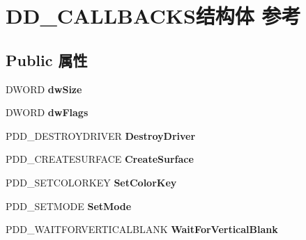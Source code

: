 \hypertarget{struct_d_d___c_a_l_l_b_a_c_k_s}{}\section{D\+D\+\_\+\+C\+A\+L\+L\+B\+A\+C\+K\+S结构体 参考}
\label{struct_d_d___c_a_l_l_b_a_c_k_s}
\subsection*{Public 属性}
\begin{DoxyCompactItemize}
\item 
\mbox{\label{struct_d_d___c_a_l_l_b_a_c_k_s_a0ffa00ff186d7938f9b721406f7f7003}} 
D\+W\+O\+RD {\bfseries dw\+Size}
\item 
\mbox{\label{struct_d_d___c_a_l_l_b_a_c_k_s_a95674558145ccefec0b7c8a6cd0afc6f}} 
D\+W\+O\+RD {\bfseries dw\+Flags}
\item 
\mbox{\label{struct_d_d___c_a_l_l_b_a_c_k_s_ac8bbbf695752486a96e44f4e75da92f8}} 
P\+D\+D\+\_\+\+D\+E\+S\+T\+R\+O\+Y\+D\+R\+I\+V\+ER {\bfseries Destroy\+Driver}
\item 
\mbox{\label{struct_d_d___c_a_l_l_b_a_c_k_s_a91add3376dc66360866d16a07969ad99}} 
P\+D\+D\+\_\+\+C\+R\+E\+A\+T\+E\+S\+U\+R\+F\+A\+CE {\bfseries Create\+Surface}
\item 
\mbox{\label{struct_d_d___c_a_l_l_b_a_c_k_s_afefd420d1f72b488a495df4684e353be}} 
P\+D\+D\+\_\+\+S\+E\+T\+C\+O\+L\+O\+R\+K\+EY {\bfseries Set\+Color\+Key}
\item 
\mbox{\label{struct_d_d___c_a_l_l_b_a_c_k_s_aa2b490f5f2c582248bace251045d3e87}} 
P\+D\+D\+\_\+\+S\+E\+T\+M\+O\+DE {\bfseries Set\+Mode}
\item 
\mbox{\label{struct_d_d___c_a_l_l_b_a_c_k_s_af2b6e93be4ce29f810f77dbb15086cf0}} 
P\+D\+D\+\_\+\+W\+A\+I\+T\+F\+O\+R\+V\+E\+R\+T\+I\+C\+A\+L\+B\+L\+A\+NK {\bfseries Wait\+For\+Vertical\+Blank}
\item 
\mbox{\label{struct_d_d___c_a_l_l_b_a_c_k_s_a5768329128978f132842f6b9ed8fb693}} 

\end{DoxyCompactItemize}
